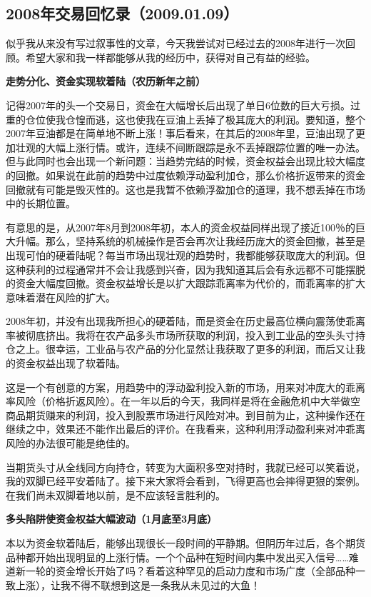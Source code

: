 \subsection{2008年交易回忆录（2009.01.09）}

似乎我从来没有写过叙事性的文章，今天我尝试对已经过去的2008年进行一次回顾。希望大家和我一样都能够从我的经历中，获得对自己有益的经验。

\textbf{走势分化、资金实现软着陆（农历新年之前）}

记得2007年的头一个交易日，资金在大幅增长后出现了单日6位数的巨大亏损。过重的仓位使我仓惶而逃，这也使我在豆油上丢掉了极其庞大的利润。要知道，整个2007年豆油都是在简单地不断上涨！事后看来，在其后的2008年里，豆油出现了更加壮观的大幅上涨行情。或许，连续不间断跟踪是永不丢掉跟踪位置的唯一办法。但与此同时也会出现一个新问题：当趋势完结的时候，资金权益会出现比较大幅度的回撤。如果说在此前的趋势中过度依赖浮动盈利加仓，那么价格折返带来的资金回撤就有可能是毁灭性的。这也是我暂不依赖浮盈加仓的道理，我不想丢掉在市场中的长期位置。

有意思的是，从2007年8月到2008年初，本人的资金权益同样出现了接近100％的巨大升幅。那么，坚持系统的机械操作是否会再次让我经历庞大的资金回撤，甚至是出现可怕的硬着陆呢？每当市场出现壮观的趋势时，我都能够获取庞大的利润。但这种获利的过程通常并不会让我感到兴奋，因为我知道其后会有永远都不可能摆脱的资金大幅度回撤。资金权益增长是以扩大跟踪乖离率为代价的，而乖离率的扩大意味着潜在风险的扩大。

2008年初，并没有出现我所担心的硬着陆，而是资金在历史最高位横向震荡使乖离率被彻底挤出。我将在农产品多头市场所获取的利润，投入到工业品的空头头寸持仓之上。很幸运，工业品与农产品的分化显然让我获取了更多的利润，而后又让我的资金权益出现了软着陆。

这是一个有创意的方案，用趋势中的浮动盈利投入新的市场，用来对冲庞大的乖离率风险（价格折返风险）。在一年以后的今天，我同样是将在金融危机中大举做空商品期货赚来的利润，投入到股票市场进行风险对冲。到目前为止，这种操作还在继续之中，效果还不能作出最后的评价。在我看来，这种利用浮动盈利来对冲乖离风险的办法很可能是绝佳的。

当期货头寸从全线同方向持仓，转变为大面积多空对持时，我就已经可以笑着说，我的双脚已经平安着陆了。接下来大家将会看到，飞得更高也会摔得更狠的案例。在我们尚未双脚着地以前，是不应该轻言胜利的。

\textbf{多头陷阱使资金权益大幅波动（1月底至3月底）}

本以为资金软着陆后，能够出现很长一段时间的平静期。但阴历年过后，各个期货品种都开始出现明显的上涨行情。一个个品种在短时间内集中发出买入信号……难道新一轮的资金增长开始了吗？看着这种罕见的启动力度和市场广度（全部品种一致上涨），让我不得不联想到这是一条我从未见过的大鱼！

